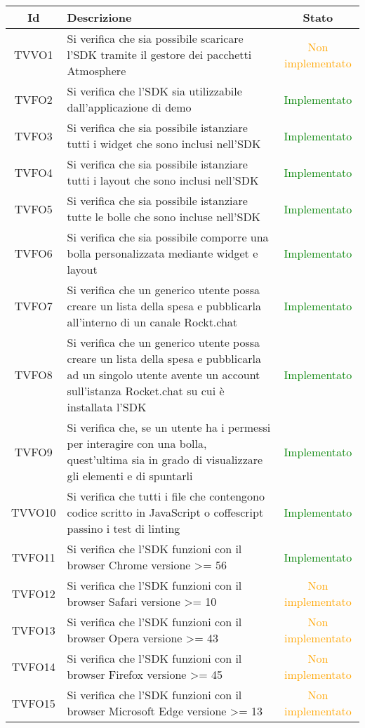 \begin{center}
	\begin{longtable}{|c|>{\centering}m{10cm}|c|}\hline
		Id & Descrizione & Stato\\ \hline
		TVVO1 & Si verifica che sia possibile scaricare l'SDK tramite il gestore dei pacchetti Atmosphere & \textcolor{Orange}{Non implementato}\\ \hline
		TVFO2 & Si verifica che l'SDK sia utilizzabile dall'applicazione di demo & \textcolor{Green}{Implementato}\\ \hline
		TVFO3 & Si verifica che sia possibile istanziare tutti i widget che sono inclusi nell'SDK & \textcolor{Green}{Implementato}\\ \hline
		TVFO4 & Si verifica che sia possibile istanziare tutti i layout che sono inclusi nell'SDK & \textcolor{Green}{Implementato}\\ \hline
		TVFO5 & Si verifica che sia possibile istanziare tutte le bolle che sono incluse nell'SDK & \textcolor{Green}{Implementato}\\ \hline
		TVFO6 & Si verifica che sia possibile comporre una bolla personalizzata mediante widget e layout & \textcolor{Green}{Implementato}\\ \hline
		TVFO7 & Si verifica che un generico utente possa creare un lista della spesa e pubblicarla all'interno di un canale Rockt.chat & \textcolor{Green}{Implementato}\\ \hline
		TVFO8 & Si verifica che un generico utente possa creare un lista della spesa e pubblicarla ad un singolo utente avente un account sull'istanza Rocket.chat su cui è installata l'SDK & \textcolor{Green}{Implementato}\\ \hline
		TVFO9 & Si verifica che, se un utente ha i permessi per interagire con una bolla, quest'ultima sia in grado di visualizzare gli elementi e di spuntarli & \textcolor{Green}{Implementato}\\ \hline
		TVVO10 & Si verifica che tutti i file che contengono codice scritto in JavaScript o coffescript passino i test di linting & \textcolor{Green}{Implementato}\\ \hline
		TVFO11 & Si verifica che l'SDK funzioni con il browser Chrome versione >= 56 & \textcolor{Green}{Implementato}\\ \hline
		TVFO12 & Si verifica che l'SDK funzioni con il browser Safari versione >= 10 & \textcolor{Orange}{Non implementato}\\ \hline
		TVFO13 & Si verifica che l'SDK funzioni con il browser Opera versione >= 43 & \textcolor{Orange}{Non implementato}\\ \hline
		TVFO14 & Si verifica che l'SDK funzioni con il browser Firefox versione >= 45 & \textcolor{Orange}{Non implementato}\\ \hline
		TVFO15 & Si verifica che l'SDK funzioni con il browser Microsoft Edge versione >= 13 & \textcolor{Orange}{Non implementato}\\ \hline
	\end{longtable}
\end{center}
